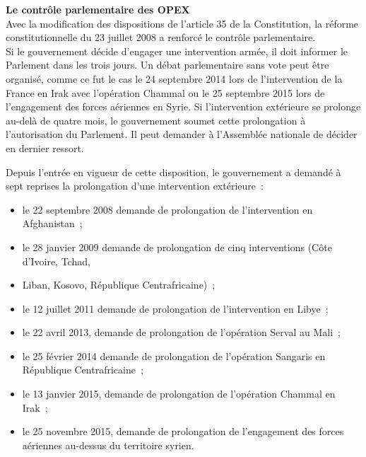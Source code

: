 \documentclass[8pt]{article}
\begin{document}
\textbf{Le contrôle parlementaire des OPEX}\\

Avec la modification des dispositions de l’article 35 de la Constitution, la réforme constitutionnelle du 23 juillet 2008 a renforcé le contrôle parlementaire.\\

Si le gouvernement décide d’engager une intervention armée, il doit informer le Parlement dans les trois jours. Un débat parlementaire sans vote peut être organisé, comme ce fut le cas le 24 septembre 2014 lors de l’intervention de la France en Irak avec l’opération Chammal ou le 25 septembre 2015 lors de l’engagement des forces aériennes en Syrie. Si l’intervention extérieure se prolonge au-delà de quatre mois, le gouvernement soumet cette prolongation à l’autorisation du Parlement. Il peut demander à l’Assemblée nationale de décider en dernier ressort.\\

\begin{center}
\end{center}

Depuis l’entrée en vigueur de cette disposition, le gouvernement a demandé à sept reprises la prolongation d’une intervention extérieure~:
\begin{itemize}
	\setlength\itemsep{-0.25em}
	\item le 22 septembre 2008 demande de prolongation de l’intervention en Afghanistan~;
	\item le 28 janvier 2009 demande de prolongation de cinq interventions (Côte d’Ivoire, Tchad, \item Liban, Kosovo, République Centrafricaine)~;
	\item le 12 juillet 2011 demande de prolongation de l’intervention en Libye~;
	\item le 22 avril 2013, demande de prolongation de l’opération Serval au Mali~;
	\item le 25 février 2014 demande de prolongation de l’opération Sangaris en République Centrafricaine~;
	\item le 13 janvier 2015, demande de prolongation de l’opération Chammal en Irak~;
	\item le 25 novembre 2015, demande de prolongation de l’engagement des forces aériennes au-dessus du territoire syrien.
\end{itemize}
\end{document}
